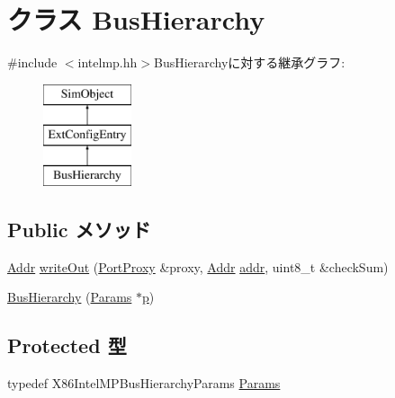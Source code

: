 \hypertarget{classX86ISA_1_1IntelMP_1_1BusHierarchy}{
\section{クラス BusHierarchy}
\label{classX86ISA_1_1IntelMP_1_1BusHierarchy}
}


{\ttfamily \#include $<$intelmp.hh$>$}BusHierarchyに対する継承グラフ:\begin{figure}[H]
\begin{center}
\leavevmode
\includegraphics[height=3cm]{classX86ISA_1_1IntelMP_1_1BusHierarchy}
\end{center}
\end{figure}
\subsection*{Public メソッド}
\begin{DoxyCompactItemize}
\item 
\hyperlink{base_2types_8hh_af1bb03d6a4ee096394a6749f0a169232}{Addr} \hyperlink{classX86ISA_1_1IntelMP_1_1BusHierarchy_a5fffc1006b1f28bd779d83ffbe213b4f}{writeOut} (\hyperlink{classPortProxy}{PortProxy} \&proxy, \hyperlink{base_2types_8hh_af1bb03d6a4ee096394a6749f0a169232}{Addr} \hyperlink{namespaceX86ISA_ab705917f60c5566f9ce56a93f798b2e2}{addr}, uint8\_\-t \&checkSum)
\item 
\hyperlink{classX86ISA_1_1IntelMP_1_1BusHierarchy_a05705f033123ff45a5d21402943e1dbc}{BusHierarchy} (\hyperlink{classX86ISA_1_1IntelMP_1_1BusHierarchy_a58526583d25b12675822cc32f4617567}{Params} $\ast$\hyperlink{namespaceX86ISA_af675c1d542a25b96e11164b80809a856}{p})
\end{DoxyCompactItemize}
\subsection*{Protected 型}
\begin{DoxyCompactItemize}
\item 
typedef X86IntelMPBusHierarchyParams \hyperlink{classX86ISA_1_1IntelMP_1_1BusHierarchy_a58526583d25b12675822cc32f4617567}{Params}
\end{DoxyCompactItemize}

